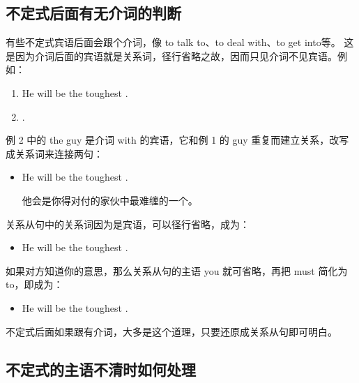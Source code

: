 \subsection{不定式后面有无介词的判断}

有些不定式宾语后面会跟个介词，像 to talk to、to deal with、to get into等。
这是因为介词后面的宾语就是关系词，径行省略之故，因而只见介词不见宾语。例
如：
\begin{enumerate}
\item He will be the toughest .
\item {}   .
\end{enumerate}
例 2 中的 the guy 是介词 with 的宾语，它和例 1 的 guy
重复而建立关系，改写成关系词来连接两句：
\begin{itemize}
\item He will be the toughest  .

  他会是你得对付的家伙中最难缠的一个。
\end{itemize}

关系从句中的关系词因为是宾语，可以径行省略，成为：
\begin{itemize}
\item He will be the toughest  .
\end{itemize}

如果对方知道你的意思，那么关系从句的主语 you 就可省略，再把 must 简化为
to，即成为：
\begin{itemize}
\item He will be the toughest  .
\end{itemize}

不定式后面如果跟有介词，大多是这个道理，只要还原成关系从句即可明白。

\subsection{不定式的主语不清时如何处理}

